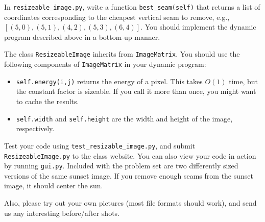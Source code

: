 \documentclass[12pt,twoside]{article}
\begin{document}
\begin{problems}
  In \verb|resizeable_image.py|, write a function
  \verb|best_seam(self)| that returns a list of coordinates
  corresponding to the cheapest vertical seam to remove, e.g.,
  $[(5,0), (5,1), (4,2), (5,3), (6,4)]$.  You should implement the
  dynamic program described above in a bottom-up manner.

  The class \verb|ResizeableImage|
  inherits from \verb|ImageMatrix|.
  You should use the following components
  of \verb|ImageMatrix| in your dynamic
  program:
  \begin{itemize}
\setlength{\labelsep}{0.5em}
  \item \verb|self.energy(i,j)| returns the energy of a pixel. This
  takes $O(1)$ time, but the constant factor is sizeable.  If you call it
  more than once, you might want to cache the results.
  \item \verb|self.width| and \verb|self.height| are the width and height
        of the image, respectively.
  \end{itemize}

  Test your code using \verb|test_resizable_image.py|, and submit
  \verb|ResizeableImage.py| to the class website. You can also view
  your code in action by running \verb|gui.py|. Included with the
  problem set are two differently sized versions of the same sunset
  image. If you remove enough seams from the sunset image, it should
  center the sun.

  Also, please try out your own pictures (most file formats should
  work), and send us any interesting before/after shots.

\newpage

\newcommand{\total}{\id{total}}
\newcommand{\stockCount}{\id{count}}
\newcommand{\priceStart}{\id{start}}
\newcommand{\priceEnd}{\id{end}}
\newcommand{\limit}{\id{limit}}

\newcommand{\itemCount}{\id{items}}
\newcommand{\itemSize}{\id{size}}
\newcommand{\itemValue}{\id{value}}
\newcommand{\capacity}{\id{capacity}}

\newcommand{\profit}{\id{profit}}
\newcommand{\purchase}{\id{purchase}}
\newcommand{\cash}{\id{cash}}
\newcommand{\current}{\id{current}}
\newcommand{\stock}{\id{stock}}
\newcommand{\result}{\id{result}}
\newcommand{\quantity}{\id{quantity}}
\newcommand{\leftover}{\id{leftover}}

\newcommand{\priceTable}{
\begin{center}
\begin{tabular}{|l|c|c|}
\hline
\bf Company & \bf Price in 1991 & \bf Price in 2011 \\ \hline
Dale, Inc. & \$12 & \$39 \\
JCN Corp. & \$10 & \$13 \\
Macroware, Inc. & \$18 & \$47 \\
Pear, Inc. & \$15 & \$45 \\ \hline
\end{tabular}
\end{center}
}


\end{problems}
\end{document}
